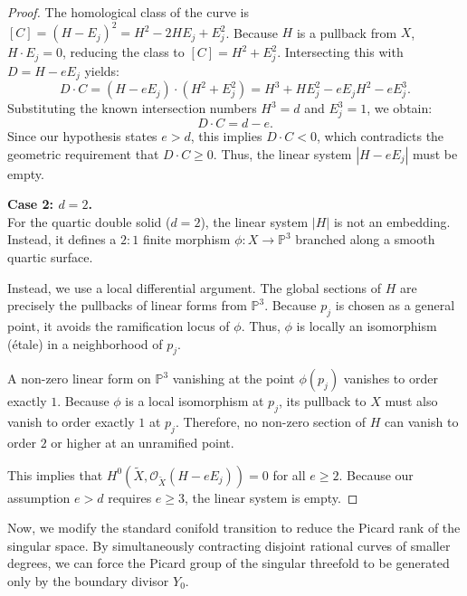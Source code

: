 \documentclass[11pt]{article}
\theoremstyle{definition}
\newcommand{\abs}[1]{\left\vert#1\right\vert}
\newcommand{\OO}{\mathcal{O}}
\newcommand{\PP}{\mathbb{P}}
\begin{document}
\begin{proof}
The homological class of the curve is $[C] = (H - E_j)^2 = H^2 - 2HE_j + E_j^2$. Because $H$ is a pullback from $X$, $H \cdot E_j = 0$, reducing the class to $[C] = H^2 + E_j^2$. Intersecting this with $D = H - eE_j$ yields:
\[
D \cdot C = (H - eE_j) \cdot (H^2 + E_j^2) = H^3 + HE_j^2 - eE_jH^2 - eE_j^3.
\]
Substituting the known intersection numbers $H^3 = d$ and $E_j^3 = 1$, we obtain:
\[
D \cdot C = d - e.
\]
Since our hypothesis states $e > d$, this implies $D \cdot C < 0$, which contradicts the geometric requirement that $D \cdot C \ge 0$. Thus, the linear system $\abs{H - eE_j}$ must be empty.

\vspace{0.5em}
\noindent\textbf{Case 2: $d = 2$.} \\
For the quartic double solid ($d=2$), the linear system $\abs{H}$ is not an embedding. Instead, it defines a $2:1$ finite morphism $\phi: X \to \PP^3$ branched along a smooth quartic surface. 

Instead, we use a local differential argument. The global sections of $H$ are precisely the pullbacks of linear forms from $\PP^3$. Because $p_j$ is chosen as a general point, it avoids the ramification locus of $\phi$. Thus, $\phi$ is locally an isomorphism (étale) in a neighborhood of $p_j$. 

A non-zero linear form on $\PP^3$ vanishing at the point $\phi(p_j)$ vanishes to order exactly $1$. Because $\phi$ is a local isomorphism at $p_j$, its pullback to $X$ must also vanish to order exactly $1$ at $p_j$. Therefore, no non-zero section of $H$ can vanish to order $2$ or higher at an unramified point. 

This implies that $H^0(\tilde{X}, \OO_{\tilde{X}}(H - eE_j)) = 0$ for all $e \ge 2$. Because our assumption $e > d$ requires $e \ge 3$, the linear system is empty.
\end{proof}

Now, we modify the standard conifold transition to reduce the Picard rank of the singular space. By simultaneously contracting disjoint rational curves of smaller degrees, we can force the Picard group of the singular threefold to be generated only by the boundary divisor $Y_0$. 
\end{document}
